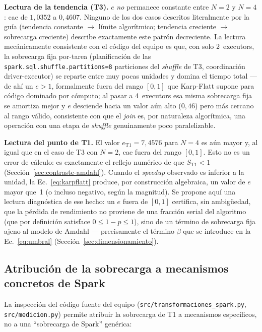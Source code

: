 \documentclass[11pt,a4paper]{article}
\begin{document}
\textbf{Lectura de la tendencia (T3).} $e$ \emph{no} permanece constante entre $N=2$ y
$N=4$: cae de $1{,}0352$ a $0{,}4607$. Ninguno de los dos casos descritos literalmente por la
gu\'ia (tendencia constante $\to$ l\'imite algor\'itmico; tendencia creciente $\to$ sobrecarga
creciente) describe exactamente este patr\'on decreciente. La lectura mec\'anicamente
consistente con el c\'odigo del equipo es que, con solo 2~executors, la sobrecarga fija
por-tarea (planificaci\'on de las \texttt{spark.\allowbreak{}sql.\allowbreak{}shuffle.\allowbreak{}partitions=\allowbreak{}8} particiones del
\textit{shuffle} de T3, coordinaci\'on driver-executor) se reparte entre muy pocas unidades y
domina el tiempo total --- de ah\'i un $e>1$, formalmente fuera del rango $[0,1]$ que Karp-Flatt
supone para c\'odigo dominado por c\'omputo; al pasar a 4~executors esa misma sobrecarga fija
se amortiza mejor y $e$ desciende hacia un valor a\'un alto ($0{,}46$) pero m\'as cercano al
rango v\'alido, consistente con que el \textit{join} es, por naturaleza algor\'itmica, una
operaci\'on con una etapa de \textit{shuffle} genuinamente poco paralelizable.

\textbf{Lectura del punto de T1.} El valor $e_{\text{T1}}=7{,}4576$ para $N=4$ es a\'un mayor
y, al igual que en el caso de T3 con $N=2$, cae fuera del rango $[0,1]$. Esto no es un error de
c\'alculo: es exactamente el reflejo num\'erico de que $S_{\text{T1}}<1$ (Secci\'on~\ref{sec:contraste-amdahl}).
Cuando el \textit{speedup} observado es inferior a la unidad, la Ec.~\eqref{eq:karpflatt}
produce, por construcci\'on algebraica, un valor de $e$ mayor que~1 (o incluso negativo, seg\'un
la magnitud). Se propone aqu\'i una lectura diagn\'ostica de ese hecho: un $e$ fuera de $[0,1]$
certifica, sin ambig\"uedad, que la p\'erdida de rendimiento no proviene de una fracci\'on
serial del algoritmo (que por definici\'on satisface $0\le 1-p\le 1$), sino de un t\'ermino de
sobrecarga fija ajeno al modelo de Amdahl --- precisamente el t\'ermino $\beta$ que se
introduce en la Ec.~\eqref{eq:umbral} (Secci\'on~\ref{sec:dimensionamiento}).

\subsection{Atribuci\'on de la sobrecarga a mecanismos concretos de Spark}
\label{sec:mecanismos}

La inspecci\'on del c\'odigo fuente del equipo (\texttt{src/\allowbreak{}transformaciones\_spark.\allowbreak{}py},
\texttt{src/\allowbreak{}medicion.\allowbreak{}py}) permite atribuir la sobrecarga de T1 a mecanismos espec\'ificos, no a
una ``sobrecarga de Spark'' gen\'erica:
\end{document}
